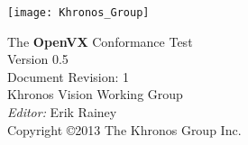 \documentclass[oneside]{book}
\begin{document}
\hypersetup{pageanchor=false,citecolor=blue}
\begin{titlepage}
\vspace*{2cm}
\texttt{[image: Khronos\_Group]}
\vspace*{2cm}
\begin{center}
{\Huge The {\bf OpenVX\texttrademark} Conformance Test} \\
\vspace*{1cm}
{\Large Version 0.5} \\
\vspace*{0.25cm}
{\Large Document Revision: 1} \\
\vspace*{1cm}
{\Large Khronos Vision Working Group} \\
\vspace*{1cm}
{\Large {\it Editor:} Erik Rainey} \\
\vspace*{1cm}
{\Large Copyright \copyright 2013 The Khronos Group Inc.} \\
\end{center}
\end{titlepage}
\end{document}

